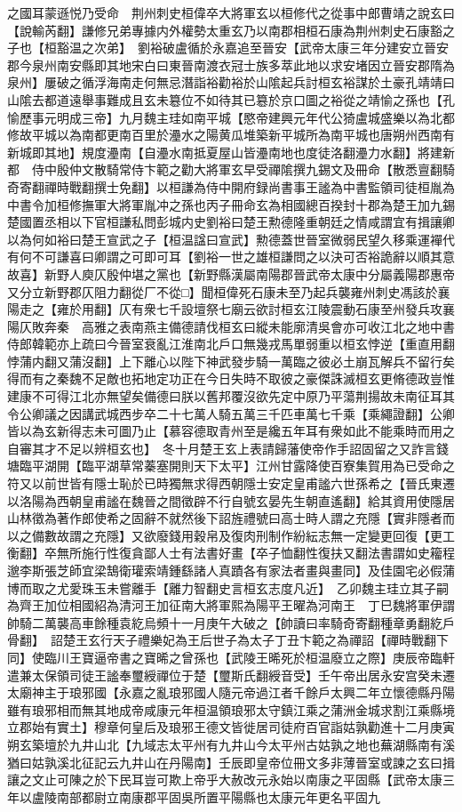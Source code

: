 之國耳蒙遜悦乃受命　荆州刺史桓偉卒大將軍玄以桓修代之從事中郎曹靖之說玄曰【說輸芮翻】謙修兄弟專據内外權勢太重玄乃以南郡相桓石康為荆州刺史石康豁之子也【桓豁温之次弟】　劉裕破盧循於永嘉追至晉安【武帝太康三年分建安立晉安郡今泉州南安縣即其地宋白曰東晉南渡衣冠士族多萃此地以求安堵因立晉安郡隋為泉州】屢破之循浮海南走何無忌潛詣裕勸裕於山隂起兵討桓玄裕謀於土豪孔靖靖曰山隂去都道遠舉事難成且玄未簒位不如待其已簒於京口圖之裕從之靖愉之孫也【孔愉歷事元明成三帝】九月魏主珪如南平城【愍帝建興元年代公猗盧城盛樂以為北都修故平城以為南都更南百里於灅水之陽黄瓜堆築新平城所為南平城也唐朔州西南有新城即其地】規度灅南【自灅水南抵夏屋山皆灅南地也度徒洛翻灅力水翻】將建新都　侍中殷仲文散騎常侍卞範之勸大將軍玄早受禪隂撰九錫文及冊命【散悉亶翻騎奇寄翻禪時戰翻撰士免翻】以桓謙為侍中開府録尚書事王謐為中書監領司徒桓胤為中書令加桓修撫軍大將軍胤冲之孫也丙子冊命玄為相國總百揆封十郡為楚王加九錫楚國置丞相以下官桓謙私問彭城内史劉裕曰楚王勲德隆重朝廷之情咸謂宜有揖讓卿以為何如裕曰楚王宣武之子【桓温諡曰宣武】勲德蓋世晉室微弱民望久移乘運襌代有何不可謙喜曰卿謂之可即可耳【劉裕一世之雄桓謙問之以決可否裕詭辭以順其意故喜】新野人庾仄殷仲堪之黨也【新野縣漢屬南陽郡晉武帝太康中分屬義陽郡惠帝又分立新野郡仄阻力翻從厂不從□】聞桓偉死石康未至乃起兵襲雍州刺史馮該於襄陽走之【雍於用翻】仄有衆七千設壇祭七廟云欲討桓玄江陵震動石康至州發兵攻襄陽仄敗奔秦　高雅之表南燕主備德請伐桓玄曰縱未能廓清吳會亦可收江北之地中書侍郎韓範亦上疏曰今晉室衰亂江淮南北戶口無幾戎馬單弱重以桓玄悖逆【重直用翻悖蒲内翻又蒲沒翻】上下離心以陛下神武發步騎一萬臨之彼必土崩瓦解兵不留行矣得而有之秦魏不足敵也拓地定功正在今日失時不取彼之豪傑誅滅桓玄更脩德政豈惟建康不可得江北亦無望矣備德曰朕以舊邦覆沒欲先定中原乃平蕩荆揚故未南征耳其令公卿議之因講武城西步卒二十七萬人騎五萬三千匹車萬七千乘【乘繩證翻】公卿皆以為玄新得志未可圖乃止【慕容德取青州至是纔五年耳有衆如此不能乘時而用之自審其才不足以辨桓玄也】　冬十月楚王玄上表請歸藩使帝作手詔固留之又詐言錢塘臨平湖開【臨平湖草常蓁塞開則天下太平】江州甘露降使百寮集賀用為已受命之符又以前世皆有隱士恥於已時獨無求得西朝隱士安定皇甫謐六世孫希之【晉氏東遷以洛陽為西朝皇甫謐在魏晉之間徵辟不行自號玄晏先生朝直遙翻】給其資用使隱居山林徵為著作郎使希之固辭不就然後下詔旌禮號曰高士時人謂之充隱【實非隱者而以之備數故謂之充隱】又欲廢錢用穀帛及復肉刑制作紛紜志無一定變更回復【更工衡翻】卒無所施行性復貪鄙人士有法書好畫【卒子恤翻性復扶又翻法書謂如史籕程邈李斯張芝師宜梁鵠衛瓘索靖鍾繇諸人真蹟各有家法者畫與畫同】及佳園宅必假蒲博而取之尤愛珠玉未嘗離手【離力智翻史言桓玄志度凡近】　乙卯魏主珪立其子嗣為齊王加位相國紹為清河王加征南大將軍熙為陽平王曜為河南王　丁巳魏將軍伊謂帥騎二萬襲高車餘種袁紇烏頻十一月庚午大破之【帥讀曰率騎奇寄翻種章勇翻紇戶骨翻】　詔楚王玄行天子禮樂妃為王后世子為太子丁丑卞範之為禪詔【禪時戰翻下同】使臨川王寶逼帝書之寶晞之曾孫也【武陵王晞死於桓温廢立之際】庚辰帝臨軒遣兼太保領司徒王謐奉璽綬禪位于楚【璽斯氏翻綬音受】壬午帝出居永安宫癸未遷太廟神主于琅邪國【永嘉之亂琅邪國人隨元帝過江者千餘戶太興二年立懷德縣丹陽雖有琅邪相而無其地成帝咸康元年桓温領琅邪太守鎮江乘之蒲洲金城求割江乘縣境立郡始有實土】穆章何皇后及琅邪王德文皆徙居司徒府百官詣姑孰勸進十二月庚寅朔玄築壇於九井山北【九域志太平州有九井山今太平州古姑孰之地也蕪湖縣南有溪猶曰姑孰溪北征記云九井山在丹陽南】壬辰即皇帝位冊文多非薄晉室或諫之玄曰揖讓之文止可陳之於下民耳豈可欺上帝乎大赦改元永始以南康之平固縣【武帝太康三年以盧陵南部都尉立南康郡平固吳所置平陽縣也太康元年更名平固九